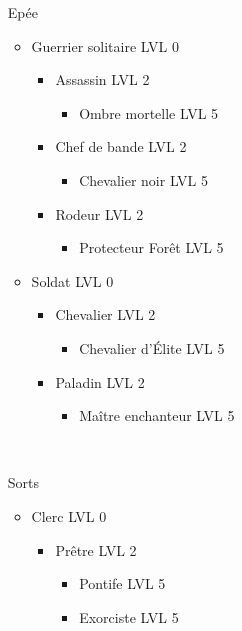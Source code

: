 \begin{itemize}
	\item[Epée] ~\\
		\begin{itemize}
			\item Guerrier solitaire LVL 0
				\begin{itemize}
					\item Assassin LVL 2
						\begin{itemize}
							\item Ombre mortelle LVL 5
						\end{itemize}
					\item Chef de bande LVL 2
						\begin{itemize}
							\item Chevalier noir LVL 5
						\end{itemize}
					\item Rodeur     LVL 2
						\begin{itemize}
							\item Protecteur Forêt LVL 5
						\end{itemize}
				\end{itemize}
			\item Soldat LVL 0
				\begin{itemize}
					\item Chevalier LVL 2
						\begin{itemize}
							\item Chevalier d'Élite LVL 5
						\end{itemize}
					\item Paladin LVL 2
						\begin{itemize}
							\item Maître enchanteur LVL 5
						\end{itemize}
				\end{itemize}
		\end{itemize}
		~\\
	\item[Sorts] ~\\
		\begin{itemize}
			\item Clerc LVL 0
				\begin{itemize}
					\item Prêtre LVL 2
						\begin{itemize}
							\item Pontife LVL 5
							\item Exorciste LVL 5
						\end{itemize}

\end{itemize}
\end{itemize}
\end{itemize}
